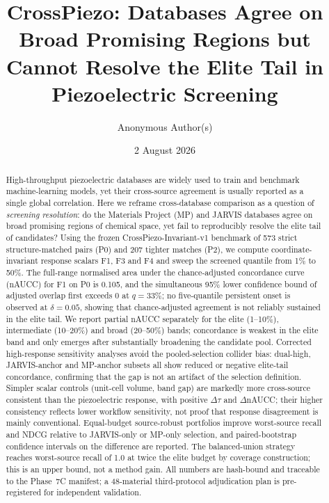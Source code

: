 \documentclass[11pt]{article}
\title{\textbf{CrossPiezo: Databases Agree on Broad Promising Regions but Cannot Resolve the Elite Tail in Piezoelectric Screening}}
\author[1]{Anonymous Author(s)}
\affil[1]{Anonymous Institution}
\date{2 August 2026}
\newcommand{\PZeroFOneNaucc}{0.105}
\newcommand{\PZeroFOneQZero}{33\%}
\begin{document}
\maketitle

\begin{abstract}
High-throughput piezoelectric databases are widely used to train and benchmark machine-learning models, yet their cross-source agreement is usually reported as a single global correlation.
Here we reframe cross-database comparison as a question of \emph{screening resolution}: do the Materials Project (MP) and JARVIS databases agree on broad promising regions of chemical space, yet fail to reproducibly resolve the elite tail of candidates?
Using the frozen CrossPiezo-Invariant-v1 benchmark of 573 strict structure-matched pairs (P0) and 207 tighter matches (P2), we compute coordinate-invariant response scalars F1, F3 and F4 and sweep the screened quantile from 1\% to 50\%.
The full-range normalised area under the chance-adjusted concordance curve (nAUCC) for F1 on P0 is \PZeroFOneNaucc{}, and the simultaneous 95\% lower confidence bound of adjusted overlap first exceeds 0 at $q=\PZeroFOneQZero{}$; no five-quantile persistent onset is observed at $\delta=0.05$, showing that chance-adjusted agreement is not reliably sustained in the elite tail.
We report partial nAUCC separately for the elite (1--10\%), intermediate (10--20\%) and broad (20--50\%) bands; concordance is weakest in the elite band and only emerges after substantially broadening the candidate pool.
Corrected high-response sensitivity analyses avoid the pooled-selection collider bias: dual-high, JARVIS-anchor and MP-anchor subsets all show reduced or negative elite-tail concordance, confirming that the gap is not an artifact of the selection definition.
Simpler scalar controls (unit-cell volume, band gap) are markedly more cross-source consistent than the piezoelectric response, with positive $\Delta\tau$ and $\Delta$nAUCC; their higher consistency reflects lower workflow sensitivity, not proof that response disagreement is mainly conventional.
Equal-budget source-robust portfolios improve worst-source recall and NDCG relative to JARVIS-only or MP-only selection, and paired-bootstrap confidence intervals on the difference are reported.
The balanced-union strategy reaches worst-source recall of 1.0 at twice the elite budget by coverage construction; this is an upper bound, not a method gain.
All numbers are hash-bound and traceable to the Phase~7C manifest; a 48-material third-protocol adjudication plan is pre-registered for independent validation.
\end{abstract}
\end{document}
